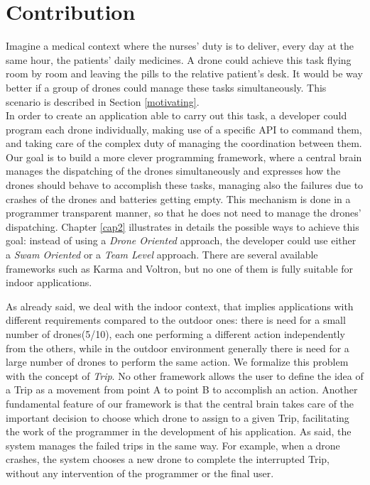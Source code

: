\section{Contribution}

Imagine a medical context where the nurses' duty is to deliver, every day at the same hour, the patients' daily medicines.
A drone could achieve this task flying room by room and leaving the pills to the relative patient's desk. 
It would be way better if a group of drones could manage these tasks simultaneously.
This scenario is described in Section \ref{motivating}.
\\

In order to create an application able to carry out this task, a developer could program each drone individually, making use of a specific API to command them, and taking care of the complex duty of managing the coordination between them. 
Our goal is to build a more clever programming framework, where a central brain manages the dispatching of the drones simultaneously and expresses how the drones should behave to accomplish these tasks, managing also the failures due to crashes of the drones and batteries getting empty.
This mechanism is done in a programmer transparent manner, so that he does not need to manage the drones' dispatching.
Chapter \ref{cap2} illustrates in details the possible ways to achieve this goal:
instead of using a \textit{Drone Oriented} approach, the developer could use either a \textit{Swam Oriented} or a \textit{Team Level} approach. 
There are several available frameworks such as Karma\cite{karma} and Voltron\cite{voltron}, but no one of them is fully suitable for indoor applications.
\\
\newpage

As already said, we deal with the indoor context, that implies applications with different requirements compared to the outdoor ones:
there is need for a small number of drones(5/10), each one performing a different action independently from the others, while in the outdoor environment generally there is need for a large number of drones to perform the same action.
We formalize this problem with the concept of \textit{Trip}.
No other framework allows the user to define the idea of a Trip as a movement from point A to point B to accomplish an action.
Another fundamental feature of our framework is that the central brain takes care of the important decision to choose which drone to assign to a given Trip, facilitating the work of the programmer in the development of his application.
As said, the system manages the failed trips in the same way.
For example, when a drone crashes, the system chooses a new drone to complete the interrupted Trip, without any intervention of the programmer or the final user.
\\

